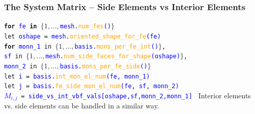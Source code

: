 \documentclass[compress]{beamer}
\begin{document}
\begin{frame}
  \frametitle{The System Matrix -- Side Elements vs Interior Elements}
  \texttt{\textbf{for} \textcolor{blue}{fe} \textbf{in} $\{1,\dots,$\textcolor{blue}{mesh.\textcolor{orange}{num\_fes}()}$\}$\\
    \hspace{0.2cm} let \textcolor{blue}{oshape} = \textcolor{blue}{mesh.\textcolor{orange}{oriented\_shape\_for\_fe}(fe)}\\
    \hspace{0.2cm} \textbf{for} \textcolor{blue}{monn\_1} in 
                     $\{1,\dots,$\textcolor{blue}{basis.\textcolor{orange}{mons\_per\_fe\_int}()}$\}$,\\
    \hspace{1.0cm} \textcolor{blue}{sf} in $\{1,\dots,$\textcolor{blue}{mesh.\textcolor{orange}{num\_side\_faces\_for\_shape}(oshape)}$\}$,\\
    \hspace{1.0cm} \textcolor{blue}{monn\_2} in 
                     $\{1,\dots,$\textcolor{blue}{basis.\textcolor{orange}{mons\_per\_fe\_side}()}$\}$\\
    \hspace{0.6cm}  let \textcolor{blue}{i} = \textcolor{blue}{basis.\textcolor{orange}{int\_mon\_el\_num}(fe, monn\_1)}\\
    \hspace{0.6cm}  let \textcolor{blue}{j} = \textcolor{blue}{basis.\textcolor{orange}{fe\_side\_mon\_el\_num}(fe, sf, monn\_2)}\\
    \hspace{0.6cm}  \textcolor{blue}{$M_{i,j}$} = \textcolor{blue}{side\_vs\_int\_vbf\_vals[oshape,sf,monn\_2,monn\_1]}
  }
  \pause
  Interior elements vs. side elements can be handled in a similar way.
\end{frame}
\end{document}

